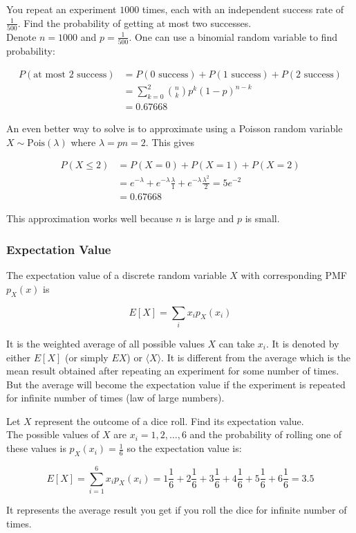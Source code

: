 \documentclass[12pt, a4paper]{article}
\newcounter{exa}
\begin{document}
\begin{texample}
You repeat an experiment $1000$ times, each with an independent success rate of $\frac{1}{500}$. Find the probability of getting at most two successes. \\

Denote $n=1000$ and $p=\frac{1}{500}$. One can use a binomial random variable to find probability:

\begin{align*}
P(\text{at most 2 success}) &= P(\text{0 success})+P(\text{1 success})+P(\text{2 success}) \\
&= \sum_{k=0}^2 {n\choose k} p^k (1-p)^{n-k} \\
&= 0.67668
\end{align*}

An even better way to solve is to approximate using a Poisson random variable $X\sim\text{Pois}(\lambda)$ where $\lambda=pn=2$. This gives

\begin{align*}
P(X \le 2)&=P(X=0)+P(X=1)+P(X=2) \\
&=e^{-\lambda}+e^{-\lambda}\frac{\lambda}{1}+e^{-\lambda}\frac{\lambda^2}{2}=5e^{-2} \\
&=0.67668
\end{align*}

This approximation works well because $n$ is large and $p$ is small.
\end{texample}

\subsubsection{Expectation Value}

The expectation value of a discrete random variable $X$ with corresponding PMF $p_X(x)$ is

$$E[X]=\sum_i x_i p_X(x_i)$$

It is the weighted average of all possible values $X$ can take $x_i$. It is denoted by either $E[X]$ (or simply $EX$) or $\langle X \rangle$. It is different from the average which is the mean result obtained after repeating an experiment for some number of times. But the average will become the expectation value if the experiment is repeated for infinite number of times (law of large numbers).

\begin{texample}
Let $X$ represent the outcome of a dice roll. Find its expectation value. \\

The possible values of $X$ are $x_i=1, 2, \dots, 6$ and the probability of rolling one of these values is $p_X(x_i)=\frac16$ so the expectation value is:

$$E[X]=\sum_{i=1}^6 x_i p_X(x_i)=1\frac16+2\frac16+3\frac16+4\frac16+5\frac16+6\frac16=3.5$$

It represents the average result you get if you roll the dice for infinite number of times.
\end{texample}
\end{document}
